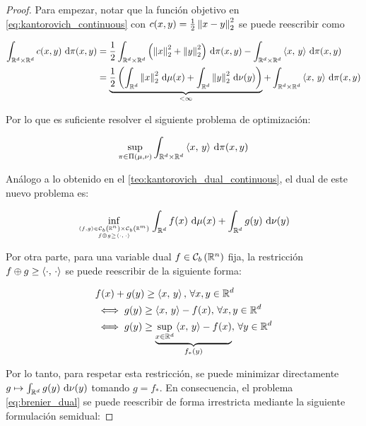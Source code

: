 \begin{proof}
	Para empezar, notar que la función objetivo en \eqref{eq:kantorovich_continuous} con $c(x,y)=\frac{1}{2}\left\lVert x-y \right\rVert_2^2$ se puede reescribir como

	\begin{align}
		\int_{\mathbb{R}^d\times\mathbb{R}^d} c(x,y) \,\operatorname{d}\!\pi(x,y) & = \frac{1}{2}\int_{\mathbb{R}^d\times\mathbb{R}^d} \left(\left\lVert x \right\rVert_2^2 + \left\lVert y \right\rVert_2^2\right) \,\operatorname{d}\!\pi(x,y) - \int_{\mathbb{R}^d\times\mathbb{R}^d} \left\langle x,\,y\right\rangle \,\operatorname{d}\!\pi(x,y)                                 \\
		                                        & = \underbrace{\frac{1}{2}\left(\int_{\mathbb{R}^d} \left\lVert x \right\rVert_2^2 \,\operatorname{d}\!\mu(x) + \int_{\mathbb{R}^d} \left\lVert y \right\rVert_2^2 \,\operatorname{d}\!\nu(y)\right)}_{<\infty} + \int_{\mathbb{R}^d\times\mathbb{R}^d} \left\langle x,\,y\right\rangle \,\operatorname{d}\!\pi(x,y)
	\end{align}

	Por lo que es suficiente resolver el siguiente problema de optimización:

	\begin{equation}
		\sup_{\pi\in\Pi(\mu,\nu)} \int_{\mathbb{R}^d\times\mathbb{R}^d} \left\langle x,\,y\right\rangle \,\operatorname{d}\!\pi(x,y)
	\end{equation}

	Análogo a lo obtenido en el \autoref{teo:kantorovich_dual_continuous}, el dual de este nuevo problema es:

	\begin{equation}
		\label{eq:brenier_dual}
		\inf_{\feasible{(f,g)\in \continuousb{\R^n}\times\continuousb{\R^m}}{f\oplus g \geq \dotproduct{\cdot}{\cdot}}}
		\int_{\R^d} f(x) \d\mu(x) + \int_{\R^d} g(y) \d\nu(y)
	\end{equation}

	Por otra parte, para una variable dual $f\in \mathcal{C}_b\left(\mathbb{R}^n\right)$ fija, la restricción $f\oplus g \geq \left\langle \cdot,\,\cdot\right\rangle$ se puede reescribir de la siguiente forma:

	\begin{align}
		 & f(x)+g(y) \geq \left\langle x,\,y\right\rangle ,\,\forall x,y\in\mathbb{R}^d                                           \\
		 & \iff g(y) \geq \left\langle x,\,y\right\rangle - f(x) ,\,\forall x,y\in\mathbb{R}^d                                    \\
		 & \iff g(y) \geq \underbrace{\sup_{x\in\mathbb{R}^d} \left\langle x,\,y\right\rangle - f(x)}_{f_*(y)},\,\forall y\in\mathbb{R}^d
	\end{align}

	Por lo tanto, para respetar esta restricción, se puede minimizar directamente $g \mapsto \int_{\mathbb{R}^d} g(y) \,\operatorname{d}\!\nu(y)$ tomando $g=f_*$. En consecuencia, el problema \eqref{eq:brenier_dual} se puede reescribir de forma irrestricta mediante la siguiente formulación semidual:


\end{proof}
